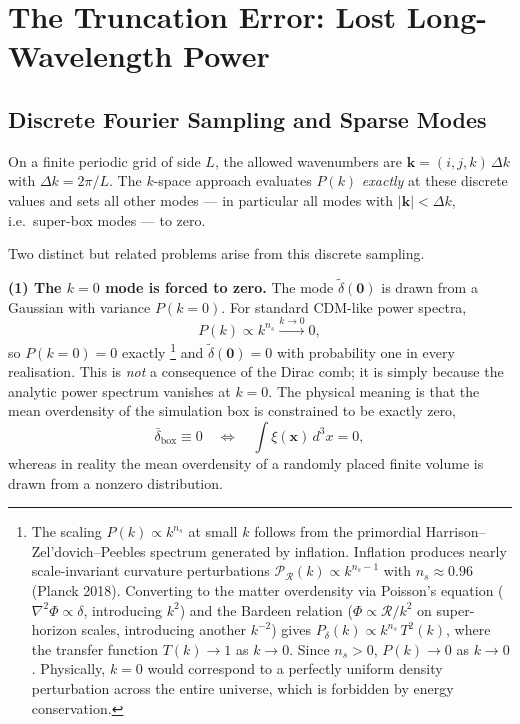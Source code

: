 \documentclass[12pt]{article}
\begin{document}
\section{The Truncation Error: Lost Long-Wavelength Power}
\label{sec:truncation}

\subsection{Discrete Fourier Sampling and Sparse Modes}

On a finite periodic grid of side $L$, the allowed wavenumbers are
$\mathbf{k} = (i,j,k)\,\Delta k$ with $\Delta k = 2\pi/L$.  The $k$-space
approach evaluates $P(k)$ \emph{exactly} at these discrete values and
sets all other modes --- in particular all modes with
$|\mathbf{k}| < \Delta k$, i.e.\ super-box modes --- to zero.

Two distinct but related problems arise from this discrete sampling.

\textbf{(1) The $k=0$ mode is forced to zero.}
The mode $\tilde{\delta}(\mathbf{0})$ is drawn from a Gaussian with
variance $P(k=0)$.  For standard CDM-like power spectra,
\begin{equation}
  P(k) \propto k^{n_s} \xrightarrow{k \to 0} 0,
\end{equation}
so $P(k=0) = 0$ exactly%
\footnote{The scaling $P(k) \propto k^{n_s}$ at small $k$ follows from
  the primordial Harrison--Zel'dovich--Peebles spectrum generated by
  inflation.  Inflation produces nearly scale-invariant curvature
  perturbations $\mathcal{P}_\mathcal{R}(k) \propto k^{n_s-1}$ with
  $n_s \approx 0.96$ (Planck 2018).  Converting to the matter
  overdensity via Poisson's equation ($\nabla^2\Phi \propto \delta$,
  introducing $k^2$) and the Bardeen relation ($\Phi \propto
  \mathcal{R}/k^2$ on super-horizon scales, introducing another
  $k^{-2}$) gives $P_\delta(k) \propto k^{n_s}\,T^2(k)$, where the
  transfer function $T(k) \to 1$ as $k \to 0$.  Since $n_s > 0$,
  $P(k) \to 0$ as $k \to 0$.  Physically, $k = 0$ would correspond to
  a perfectly uniform density perturbation across the entire universe,
  which is forbidden by energy conservation.} and $\tilde{\delta}(\mathbf{0}) = 0$ with
probability one in every realisation.  This is \emph{not} a consequence
of the Dirac comb; it is simply because the analytic power spectrum
vanishes at $k=0$.  The physical meaning is that the mean overdensity
of the simulation box is constrained to be exactly zero,
\begin{equation}
  \bar{\delta}_\mathrm{box} \equiv 0
  \quad \Longleftrightarrow \quad
  \int \xi(\mathbf{x})\,d^3x = 0,
  \label{eq:zeromean}
\end{equation}
whereas in reality the mean overdensity of a randomly placed finite
volume is drawn from a nonzero distribution.
\end{document}
